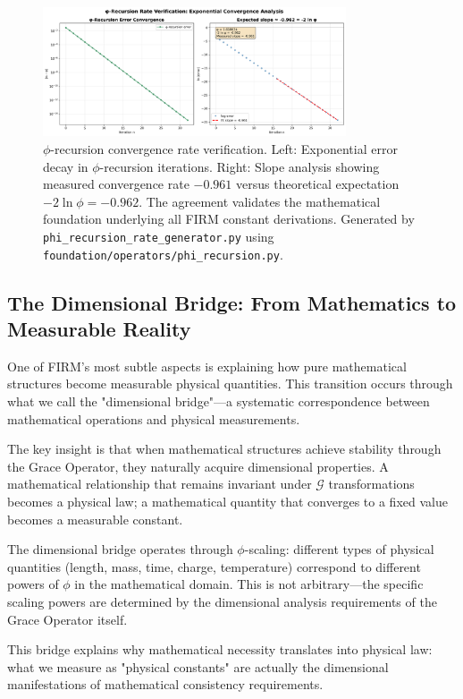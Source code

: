 \documentclass[12pt]{article}
\newcommand{\G}{\mathcal{G}}                %
\begin{document}
\begin{figure}[H]
    \centering
    \includegraphics[width=0.8\textwidth]{figures/outputs/phi_recursion_rate_verification.png}
    \caption{$\phi$-recursion convergence rate verification. Left: Exponential error decay in $\phi$-recursion iterations. Right: Slope analysis showing measured convergence rate $-0.961$ versus theoretical expectation $-2 \ln \phi = -0.962$. The agreement validates the mathematical foundation underlying all FIRM constant derivations. Generated by \texttt{phi\_recursion\_rate\_generator.py} using \texttt{foundation/operators/phi\_recursion.py}.}
    \label{fig:phi_recursion}
\end{figure}

\subsection{The Dimensional Bridge: From Mathematics to Measurable Reality}

One of FIRM's most subtle aspects is explaining how pure mathematical structures become measurable physical quantities. This transition occurs through what we call the "dimensional bridge"---a systematic correspondence between mathematical operations and physical measurements.

The key insight is that when mathematical structures achieve stability through the Grace Operator, they naturally acquire dimensional properties. A mathematical relationship that remains invariant under $\G$ transformations becomes a physical law; a mathematical quantity that converges to a fixed value becomes a measurable constant.

The dimensional bridge operates through $\phi$-scaling: different types of physical quantities (length, mass, time, charge, temperature) correspond to different powers of $\phi$ in the mathematical domain. This is not arbitrary—the specific scaling powers are determined by the dimensional analysis requirements of the Grace Operator itself.

This bridge explains why mathematical necessity translates into physical law: what we measure as "physical constants" are actually the dimensional manifestations of mathematical consistency requirements.
\end{document}
